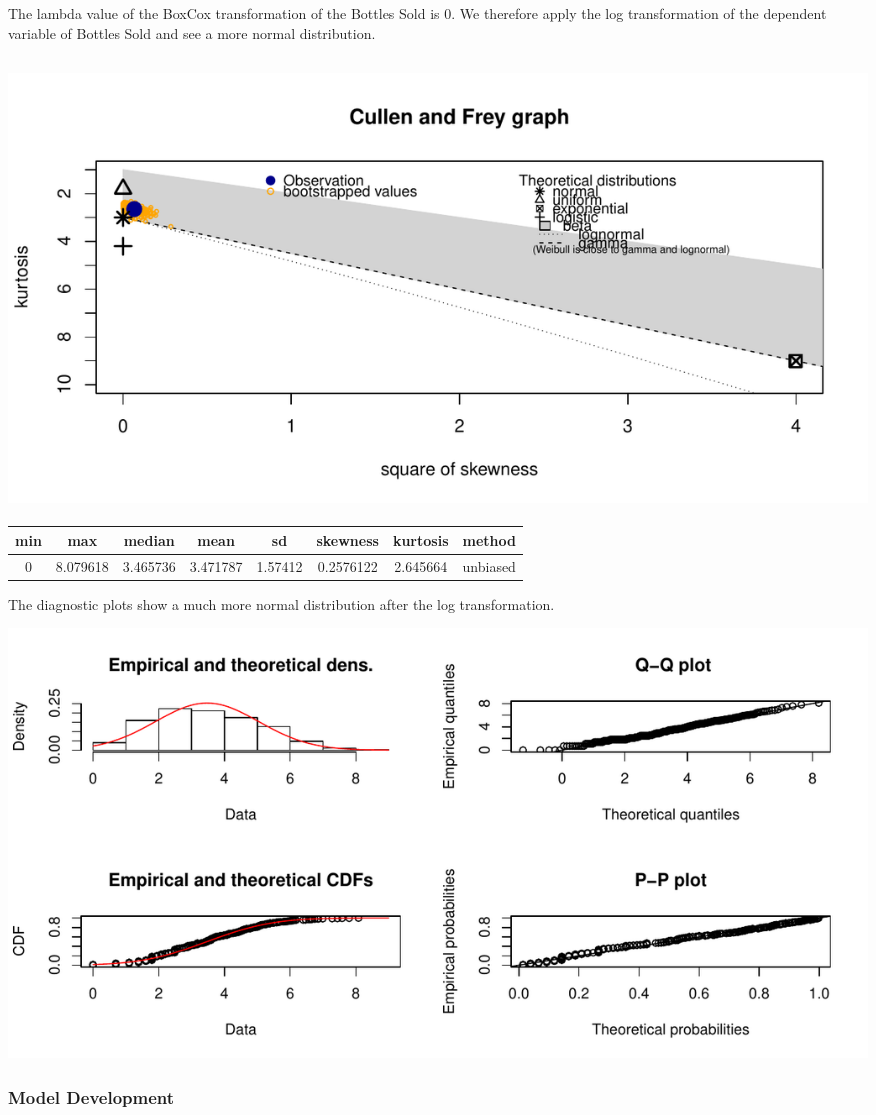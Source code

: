 \documentclass[]{elsarticle} %
\makeatletter
\def\maxwidth{\ifdim\Gin@nat@width>\linewidth\linewidth
\else\Gin@nat@width\fi}
\let\Oldincludegraphics\includegraphics
\renewcommand{\includegraphics}[1]{\Oldincludegraphics[width=\maxwidth]{#1}}
\makeatother
\begin{document}
The lambda value of the BoxCox transformation of the Bottles Sold is 0.
We therefore apply the log transformation of the dependent variable of
Bottles Sold and see a more normal distribution.

\subsection{\texorpdfstring{\protect\includegraphics{Final_Project_files/figure-latex/unnamed-chunk-12-1.pdf}}{}}\label{section-1}

\begin{longtable}[]{@{}cccccccc@{}}
\toprule
min & max & median & mean & sd & skewness & kurtosis &
method\tabularnewline
\midrule
\endhead
0 & 8.079618 & 3.465736 & 3.471787 & 1.57412 & 0.2576122 & 2.645664 &
unbiased\tabularnewline
\bottomrule
\end{longtable}

\newpage

The diagnostic plots show a much more normal distribution after the log
transformation.

\includegraphics{Final_Project_files/figure-latex/unnamed-chunk-13-1.pdf}

\subsubsection{Model Development}\label{model-development}
\end{document}
